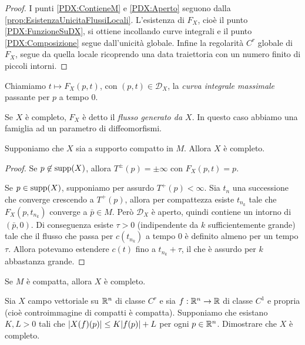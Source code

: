 \begin{proof}
	I punti \ref{PDX:ContieneM} e \ref{PDX:Aperto} seguono dalla \cref{prop:EsistenzaUnicitaFlussiLocali}. L'esistenza di $F_X$, cioè il punto \ref{PDX:FunzioneSuDX}, si ottiene incollando curve integrali e il punto \ref{PDX:Composizione} segue dall'unicità globale.
	Infine la regolarità $C^r$ globale di $F_X$, segue da quella locale ricoprendo una data traiettoria con un numero finito di piccoli intorni.
\end{proof}

\begin{definition}  
	Chiamiamo $t\mapsto F_X(p,t)$, con $(p,t)\in\mathcal D_X$, la \emph{curva integrale massimale} passante per $p$ a tempo 0.
	
	Se $X$ è completo, $F_X$ è detto il \emph{flusso generato da $X$}. In questo caso abbiamo una famiglia ad un parametro di diffeomorfismi.
\end{definition}

\begin{proposition}
	Supponiamo che $X$ sia a supporto compatto in $M$. Allora $X$ è completo.
\end{proposition}

\begin{proof}
	Se $p\not \in\operatorname{supp} (X)$, allora $T^{\pm}(p)=\pm\infty$ con $F_X(p,t)=p$.
	
	Se $p\in\operatorname{supp}(X)$, supponiamo per assurdo $T^+(p)<\infty$. Sia $t_n$ una successione che converge crescendo a $T^+(p)$, allora per compattezza esiste $t_{n_k}$ tale che $F_X(p,t_{n_k})$ converge a $\bar p\in M$.
	Però $\mathcal D_X$ è aperto, quindi contiene un intorno di $(\bar p,0)$.
	Di conseguenza esiste $\tau >0$ (indipendente da $k$ sufficientemente grande) tale che il flusso che passa per $c(t_{n_k})$ a tempo 0 è definito almeno per un tempo $\tau$.
	Allora potevamo estendere $c(t)$ fino a $t_{n_k}+\tau$, il che è assurdo per $k$ abbastanza grande.
\end{proof}


\begin{corollary}
	Se $M$ è compatta, allora $X$ è completo.
\end{corollary}


\begin{exercise}
	Sia $X$ campo vettoriale su $\mathbb R^n$ di classe $C^r$ e sia $f:\mathbb R^n\to \mathbb R$ di classe $C^1$ e propria (cioè controimmagine di compatti è compatta). Supponiamo che esistano $K,L>0$ tali che $\lvert X(f)(p)\rvert\le K\lvert f(p)\rvert+L$ per ogni $p\in\mathbb R^n$. %
	Dimostrare che $X$ è completo. %
\end{exercise}
